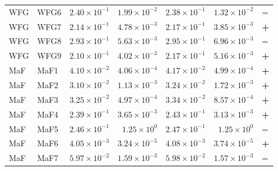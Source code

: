 \begin{table}[t]
\begin{tabular}{llrrrrl}
WFG & WFG6 & $2.40\!\times\!10^{-1}$ & $1.99\!\times\!10^{-2}$ & $2.38\!\times\!10^{-1}$ & $1.32\!\times\!10^{-2}$ & = \\
WFG & WFG7 & $2.14\!\times\!10^{-1}$ & $4.78\!\times\!10^{-3}$ & $2.17\!\times\!10^{-1}$ & $3.85\!\times\!10^{-3}$ & \textbf{+} \\
WFG & WFG8 & $2.93\!\times\!10^{-1}$ & $5.63\!\times\!10^{-3}$ & $2.95\!\times\!10^{-1}$ & $6.96\!\times\!10^{-3}$ & = \\
WFG & WFG9 & $2.10\!\times\!10^{-1}$ & $4.02\!\times\!10^{-3}$ & $2.17\!\times\!10^{-1}$ & $5.16\!\times\!10^{-3}$ & \textbf{+} \\
\addlinespace
MaF & MaF1 & $4.10\!\times\!10^{-2}$ & $4.06\!\times\!10^{-4}$ & $4.17\!\times\!10^{-2}$ & $4.99\!\times\!10^{-4}$ & \textbf{+} \\
MaF & MaF2 & $3.10\!\times\!10^{-2}$ & $1.13\!\times\!10^{-3}$ & $3.24\!\times\!10^{-2}$ & $1.72\!\times\!10^{-3}$ & \textbf{+} \\
MaF & MaF3 & $3.25\!\times\!10^{-2}$ & $4.97\!\times\!10^{-4}$ & $3.34\!\times\!10^{-2}$ & $8.57\!\times\!10^{-4}$ & \textbf{+} \\
MaF & MaF4 & $2.39\!\times\!10^{-1}$ & $3.65\!\times\!10^{-3}$ & $2.43\!\times\!10^{-1}$ & $3.13\!\times\!10^{-3}$ & \textbf{+} \\
MaF & MaF5 & $2.46\!\times\!10^{-1}$ & $1.25\!\times\!10^{0}$ & $2.47\!\times\!10^{-1}$ & $1.25\!\times\!10^{0}$ & = \\
MaF & MaF6 & $4.05\!\times\!10^{-3}$ & $3.24\!\times\!10^{-5}$ & $4.08\!\times\!10^{-3}$ & $3.74\!\times\!10^{-5}$ & \textbf{+} \\
MaF & MaF7 & $5.97\!\times\!10^{-2}$ & $1.59\!\times\!10^{-3}$ & $5.98\!\times\!10^{-2}$ & $1.57\!\times\!10^{-3}$ & = \\
\bottomrule
\end{tabular}
\end{table}
